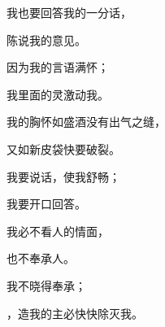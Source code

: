 {\par }{\Q {}我也要回答我的一分话，
\par }{\Q 陈说我的意见。
\par }{\Q {}因为我的言语满怀；
\par }{\Q 我里面的灵激动我。
\par }{\Q {}我的胸怀如盛酒{}没有出气之缝，
\par }{\Q 又如新皮袋快要破裂。
\par }{\Q {}我要说话，使我舒畅；
\par }{\Q 我要开口回答。
\par }{\Q {}我必不看人的情面，
\par }{\Q 也不奉承人。
\par }{\Q {}我不晓得奉承；
\par }{，造我的主必快快除灭我。

}
